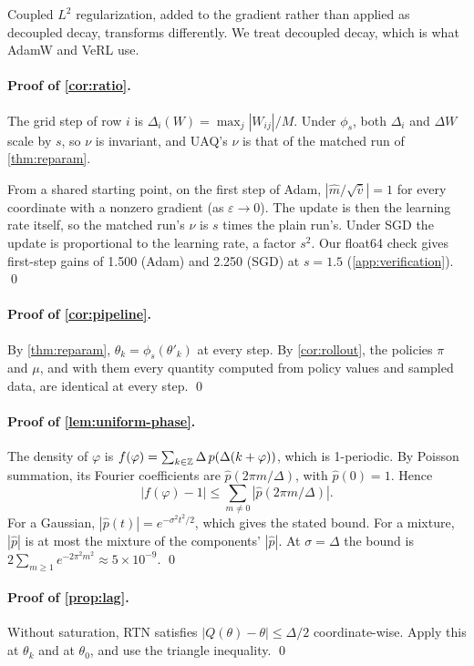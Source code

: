Coupled $L^2$ regularization, added to the gradient rather than applied as decoupled decay, transforms differently. We treat decoupled decay, which is what AdamW and VeRL use.

\paragraph{Proof of \cref{cor:ratio}.} The grid step of row $i$ is $\Delta_i(W)=\max_j|W_{ij}|/M$. Under $\phi_s$, both $\Delta_i$ and $\Delta W$ scale by $s$, so $\nu$ is invariant, and UAQ's $\nu$ is that of the matched run of \cref{thm:reparam}.

From a shared starting point, on the first step of Adam, $|\hat m/\sqrt{\hat v}|=1$ for every coordinate with a nonzero gradient (as $\varepsilon\to0$). The update is then the learning rate itself, so the matched run's $\nu$ is $s$ times the plain run's. Under SGD the update is proportional to the learning rate, a factor $s^2$. Our float64 check gives first-step gains of 1.500 (Adam) and 2.250 (SGD) at $s=1.5$ (\cref{app:verification}). \qed

\paragraph{Proof of \cref{cor:pipeline}.} By \cref{thm:reparam}, $\theta_k=\phi_s(\theta'_k)$ at every step. By \cref{cor:rollout}, the policies $\pi$ and $\mu$, and with them every quantity computed from policy values and sampled data, are identical at every step. \qed

\paragraph{Proof of \cref{lem:uniform-phase}.} The density of $\varphi$ is $f(\varphi)=\sum_{k\in\mathbb{Z}}\Delta\,p(\Delta(k+\varphi))$, which is 1-periodic. By Poisson summation, its Fourier coefficients are $\hat p(2\pi m/\Delta)$, with $\hat p(0)=1$. Hence
\[
|f(\varphi)-1|\le\sum_{m\neq0}|\hat p(2\pi m/\Delta)| .
\]
For a Gaussian, $|\hat p(t)|=e^{-\sigma^2t^2/2}$, which gives the stated bound. For a mixture, $|\hat p|$ is at most the mixture of the components' $|\hat p|$. At $\sigma=\Delta$ the bound is $2\sum_{m\ge1}e^{-2\pi^2m^2}\approx5\times10^{-9}$. \qed

\paragraph{Proof of \cref{prop:lag}.} Without saturation, RTN satisfies $|Q(\theta)-\theta|\le\Delta/2$ coordinate-wise. Apply this at $\theta_k$ and at $\theta_0$, and use the triangle inequality. \qed

